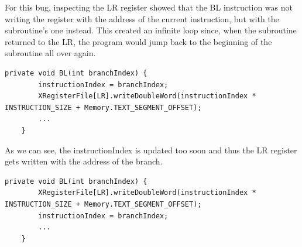 For this bug, inspecting the LR register showed that the BL instruction was not writing the register with the address of the current instruction, but with the subroutine's one instead. This created an infinite loop since, when the subroutine returned to the LR, the program would jump back to the beginning of the subroutine all over again.
\begin{lstlisting}[caption={The buggy address writing}]
	private void BL(int branchIndex) {
		instructionIndex = branchIndex;
		XRegisterFile[LR].writeDoubleWord(instructionIndex * INSTRUCTION_SIZE + Memory.TEXT_SEGMENT_OFFSET);
		...
	}
\end{lstlisting}
As we can see, the instructionIndex is updated too soon and thus the LR register gets written with the address of the branch.
\begin{lstlisting}[caption={The fixed address writing}]
	private void BL(int branchIndex) {
		XRegisterFile[LR].writeDoubleWord(instructionIndex * INSTRUCTION_SIZE + Memory.TEXT_SEGMENT_OFFSET);
		instructionIndex = branchIndex;
		...
	}
\end{lstlisting}

